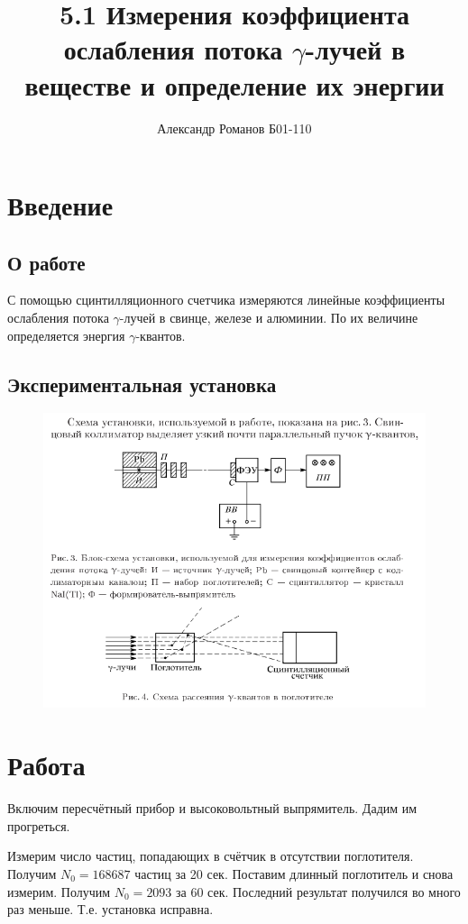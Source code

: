 \documentclass{article}
\author{Александр Романов Б01-110}
\date{}
\title{5.1 Измерения коэффициента ослабления потока \(\gamma\)-лучей в веществе и определение их энергии}
\begin{document}
\maketitle
\section{Введение}
\subsection{О работе}
С помощью сцинтилляционного счетчика измеряются линейные коэффициенты ослабления потока \(\gamma\)-лучей в
свинце, железе и алюминии. По их величине определяется энергия \(\gamma\)-квантов.
\subsection{Экспериментальная установка}
\begin{figure}[H]
	\includegraphics[width=\textwidth]{scheme.png}
\end{figure}
\section{Работа}
Включим пересчётный прибор и высоковольтный выпрямитель. Дадим им прогреться.

Измерим число частиц, попадающих в счётчик в отсутствии поглотителя. Получим \(N_0 = 168687\) частиц за
20 сек. Поставим длинный поглотитель и снова измерим. Получим \(N_0 = 2093\) за 60 сек. Последний результат
получился во много раз меньше. Т.е. установка исправна.
\end{document}
